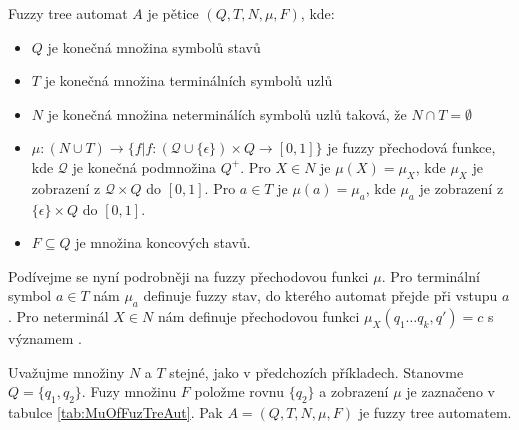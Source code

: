 \documentclass[a4paper,10pt]{article}
\begin{document}
\begin{definition}
 Fuzzy tree automat $A$ je pětice $(Q, T, N, \mu, F)$, kde:
 \begin{itemize}
  \item $Q$ je konečná množina symbolů stavů
  \item $T$ je konečná množina terminálních symbolů uzlů
  \item $N$ je konečná množina neterminálích symbolů uzlů taková, že $N \cap T = \emptyset$
  \item $\mu: (N \cup T) \rightarrow \{ f | f: (\mathcal{Q} \cup \{ \epsilon \}) \times Q \rightarrow [0,1]  \}$ je fuzzy přechodová funkce, kde $\mathcal{Q}$ je konečná podmnožina $Q^+$. Pro $X \in N$ je $\mu(X) = \mu_X$, kde $\mu_X$ je zobrazení z $\mathcal{Q} \times Q$ do $[0,1]$. Pro $a \in T$ je $\mu(a) = \mu_a$, kde $\mu_a$ je zobrazení z $\{ \epsilon \} \times Q $ do $[0,1]$.
  \item $F \subseteq Q$ je množina koncových stavů.
 \end{itemize}
\end{definition}

Podívejme se nyní podrobněji na fuzzy přechodovou funkci $\mu$. Pro terminální symbol $a \in T$ nám $\mu_a$ definuje fuzzy stav, do kterého automat přejde při vstupu $a$. Pro neterminál $X \in N$ nám definuje přechodovou funkci $\mu_X(q_1 \dots q_k, q') = c$ s významem . 

\begin{example}
 Uvažujme množiny $N$ a $T$ stejné, jako v předchozích příkladech. Stanovme $Q = \{ q_1, q_2 \}$. Fuzy množinu $F$ položme rovnu $\{ q_2 \}$ a zobrazení $\mu$ je zaznačeno v tabulce \ref{tab:MuOfFuzTreAut}. Pak $A = (Q, T, N, \mu, F)$ je fuzzy tree automatem.
\end{example}
\end{document}
